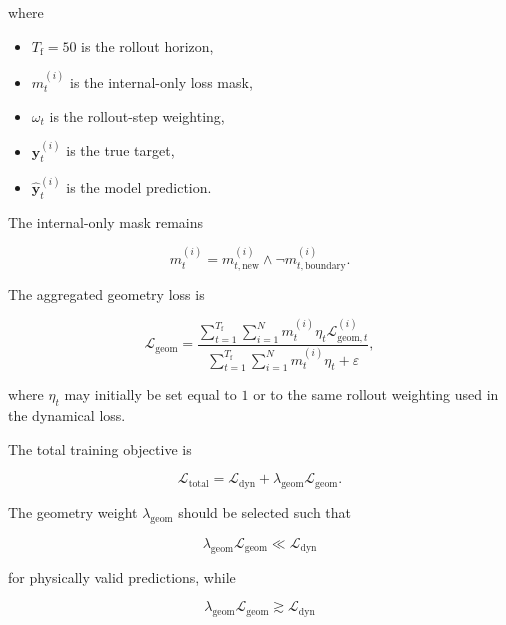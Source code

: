 \documentclass[11pt]{article}
\begin{document}
where

\begin{itemize}[leftmargin=1.5em]
    \item $T_{\mathrm{f}}=50$ is the rollout horizon,
    \item $m_{t}^{(i)}$ is the internal-only loss mask,
    \item $\omega_{t}$ is the rollout-step weighting,
    \item $\bm{y}_{t}^{(i)}$ is the true target,
    \item $\hat{\bm{y}}_{t}^{(i)}$ is the model prediction.
\end{itemize}

The internal-only mask remains

\begin{equation}
    m_{t}^{(i)}
    =
    m_{t,\mathrm{new}}^{(i)}
    \land
    \neg
    m_{t,\mathrm{boundary}}^{(i)}.
\end{equation}

The aggregated geometry loss is

\begin{equation}
    \mathcal{L}_{\mathrm{geom}}
    =
    \frac{
    \sum\limits_{t=1}^{T_{\mathrm{f}}}
    \sum\limits_{i=1}^{N}
    m_{t}^{(i)}
    \eta_{t}
    \mathcal{L}_{\mathrm{geom},t}^{(i)}
    }{
    \sum\limits_{t=1}^{T_{\mathrm{f}}}
    \sum\limits_{i=1}^{N}
    m_{t}^{(i)}
    \eta_{t}
    +\varepsilon
    },
\end{equation}

where $\eta_t$ may initially be set equal to $1$ or to the same rollout weighting used in the dynamical loss.

The total training objective is

\begin{equation}
    \mathcal{L}_{\mathrm{total}}
    =
    \mathcal{L}_{\mathrm{dyn}}
    +
    \lambda_{\mathrm{geom}}
    \mathcal{L}_{\mathrm{geom}}.
\end{equation}

The geometry weight $\lambda_{\mathrm{geom}}$ should be selected such that

\begin{equation}
    \lambda_{\mathrm{geom}}
    \mathcal{L}_{\mathrm{geom}}
    \ll
    \mathcal{L}_{\mathrm{dyn}}
\end{equation}

for physically valid predictions, while

\begin{equation}
    \lambda_{\mathrm{geom}}
    \mathcal{L}_{\mathrm{geom}}
    \gtrsim
    \mathcal{L}_{\mathrm{dyn}}
\end{equation}
\end{document}
